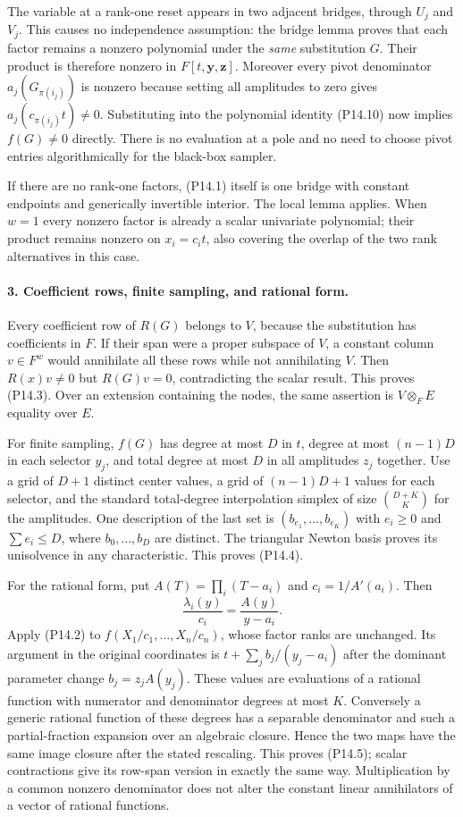 The variable at a rank-one reset appears in two adjacent
bridges, through $U_j$ and $V_j$. This causes no independence
assumption: the bridge lemma proves that each factor remains
a nonzero polynomial under the \emph{same} substitution $G$.
Their product is therefore nonzero in
$F[t,\mathbf y,\mathbf z]$. Moreover every pivot denominator
$a_j(G_{\pi(i_j)})$ is nonzero because setting all amplitudes
to zero gives $a_j(c_{\pi(i_j)}t)\ne0$. Substituting into the
polynomial identity (P14.10) now implies $f(G)\ne0$ directly.
There is no evaluation at a pole and no need to choose pivot
entries algorithmically for the black-box sampler.

If there are no rank-one factors, (P14.1) itself is one bridge
with constant endpoints and generically invertible interior.
The local lemma applies. When $w=1$ every nonzero factor is
already a scalar univariate polynomial; their product remains
nonzero on $x_i=c_it$, also covering the overlap of the two
rank alternatives in this case.

\paragraph{3. Coefficient rows, finite sampling, and rational form.}
Every coefficient row of $R(G)$ belongs to $V$, because the
substitution has coefficients in $F$. If their span were a
proper subspace of $V$, a constant column $v\in F^w$ would
annihilate all these rows while not annihilating $V$. Then
$R(x)v\ne0$ but $R(G)v=0$, contradicting the scalar result.
This proves (P14.3). Over an extension containing the nodes,
the same assertion is $V\otimes_F E$ equality over $E$.

For finite sampling, $f(G)$ has degree at most $D$ in $t$,
degree at most $(n-1)D$ in each selector $y_j$, and total degree
at most $D$ in all amplitudes $z_j$ together. Use a grid of
$D+1$ distinct center values, a grid of $(n-1)D+1$ values for
each selector, and the standard total-degree interpolation
simplex of size $\binom{D+K}{K}$ for the amplitudes. One
description of the last set is
$(b_{e_1},\ldots,b_{e_K})$ with $e_i\geq0$ and
$\sum e_i\leq D$, where $b_0,\ldots,b_D$ are distinct.
The triangular Newton basis proves its unisolvence in any
characteristic. This proves (P14.4).

For the rational form, put $A(T)=\prod_i(T-a_i)$ and
$c_i=1/A'(a_i)$. Then
\[
 \frac{\lambda_i(y)}{c_i}=\frac{A(y)}{y-a_i}.
 \tag{P14.11}
\]
Apply (P14.2) to $f(X_1/c_1,\ldots,X_n/c_n)$, whose factor
ranks are unchanged. Its argument in the original coordinates
is $t+\sum_j b_j/(y_j-a_i)$ after the dominant parameter
change $b_j=z_jA(y_j)$. These values are evaluations of a
rational function with numerator and denominator degrees at
most $K$. Conversely a generic rational function of these
degrees has a separable denominator and such a partial-fraction
expansion over an algebraic closure. Hence the two maps have
the same image closure after the stated rescaling. This
proves (P14.5); scalar contractions give its row-span version
in exactly the same way. Multiplication by a common nonzero
denominator does not alter the constant linear annihilators
of a vector of rational functions.

